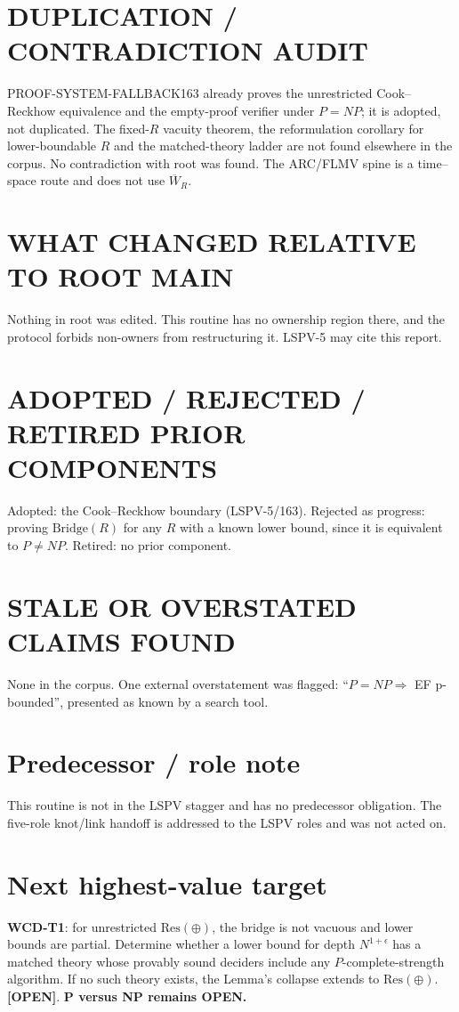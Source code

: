 \documentclass[11pt]{article}
\theoremstyle{definition}
\newcommand{\Wbar}{\overline W}
\newcommand{\st}[1]{\textbf{[#1]}}
\begin{document}
\section{DUPLICATION / CONTRADICTION AUDIT}
PROOF-SYSTEM-FALLBACK163 already proves the unrestricted Cook--Reckhow equivalence and the
empty-proof verifier under $P=NP$; it is adopted, not duplicated. The fixed-$R$ vacuity
theorem, the reformulation corollary for lower-boundable $R$ and the matched-theory ladder
are not found elsewhere in the corpus. No contradiction with root  was found.
The ARC/FLMV spine is a time--space route and does not use $\Wbar_R$.

\section{WHAT CHANGED RELATIVE TO ROOT MAIN}
Nothing in root  was edited. This routine has no ownership region there, and
the protocol forbids non-owners from restructuring it. LSPV-5 may cite this report.

\section{ADOPTED / REJECTED / RETIRED PRIOR COMPONENTS}
Adopted: the Cook--Reckhow boundary (LSPV-5/163). Rejected as progress: proving
$\mathrm{Bridge}(R)$ for any $R$ with a known lower bound, since it is equivalent to
$P\ne NP$. Retired: no prior component.

\section{STALE OR OVERSTATED CLAIMS FOUND}
None in the corpus. One external overstatement was flagged: ``$P=NP\Rightarrow$ EF
p-bounded'', presented as known by a search tool.

\section{Predecessor / role note}
This routine is not in the LSPV stagger and has no predecessor obligation. The five-role
knot/link handoff is addressed to the LSPV roles and was not acted on.

\section{Next highest-value target}
\textbf{WCD-T1}: for unrestricted $\mathrm{Res}(\oplus)$, the bridge is not vacuous and
lower bounds are partial. Determine whether a lower bound for depth $N^{1+\epsilon}$ has a
matched theory whose provably sound deciders include any $P$-complete-strength algorithm.
If no such theory exists, the Lemma's collapse extends to $\mathrm{Res}(\oplus)$.
\st{OPEN}. \textbf{P versus NP remains OPEN.}
\end{document}
